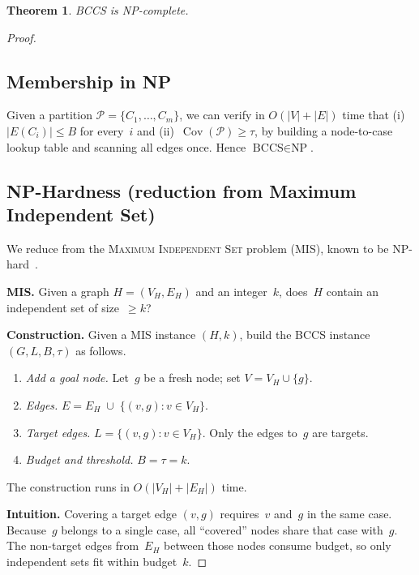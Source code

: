 \documentclass[11pt]{article}
\newtheorem{theorem}{Theorem}
\begin{document}
\begin{theorem}\label{thm:npc}
BCCS is NP-complete.
\end{theorem}

\begin{proof}

\subsection*{Membership in NP}

Given a partition $\mathcal{P}=\{C_1,\dots,C_m\}$, we can verify in
$O(|V|+|E|)$ time that (i)~$|E(C_i)|\le B$ for every~$i$
and (ii)~$\operatorname{Cov}(\mathcal{P})\ge\tau$, by building a
node-to-case lookup table and scanning all edges once.
Hence $\text{BCCS}\in\text{NP}$.

\subsection*{NP-Hardness (reduction from Maximum Independent Set)}

We reduce from the \textsc{Maximum Independent Set} problem (MIS),
known to be NP-hard~\cite{karp1972}.

\medskip\noindent
\textbf{MIS.}\;
Given a graph $H=(V_H,E_H)$ and an integer~$k$, does~$H$ contain an
independent set of size~$\ge k$?

\medskip\noindent
\textbf{Construction.}\;
Given a MIS instance $(H,k)$, build the BCCS instance
$(G,L,B,\tau)$ as follows.

\begin{enumerate}
\item \emph{Add a goal node.}
      Let~$g$ be a fresh node; set $V=V_H\cup\{g\}$.

\item \emph{Edges.}
      $E = E_H \;\cup\; \{(v,g) : v\in V_H\}$.

\item \emph{Target edges.}
      $L = \{(v,g) : v\in V_H\}$.
      Only the edges to~$g$ are targets.

\item \emph{Budget and threshold.}
      $B = \tau = k$.
\end{enumerate}

The construction runs in $O(|V_H|+|E_H|)$ time.

\medskip\noindent
\textbf{Intuition.}\;
Covering a target edge $(v,g)$ requires~$v$ and~$g$ in the same case.
Because~$g$ belongs to a single case, all ``covered'' nodes share that
case with~$g$.  The non-target edges from~$E_H$ between those nodes
consume budget, so only independent sets fit within budget~$k$.


\end{proof}
\end{document}
